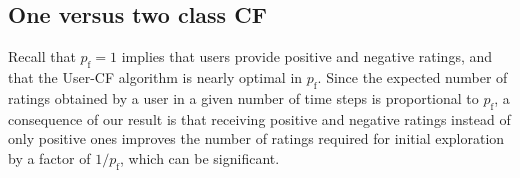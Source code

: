 \documentclass{article}
\newcommand\Comment[1]{\framebox[0.5\textwidth]{ \parbox{0.5\textwidth}{#1}  } \par}
\newcommand\pf{p_{\mathrm{f}}}
\newcommand{\setQ}{\mc Q}
\begin{document}



\vspace{-0.2cm}
\subsection{One versus two class CF}
\vspace{-0.2cm}

Recall that $\pf=1$ implies that users provide positive and negative ratings, and that the User-CF algorithm is nearly optimal in $\pf$. Since the expected number of ratings obtained by a user in a given number of time steps is proportional to $\pf$, 
 a consequence of our result is that receiving positive and negative ratings instead of only positive ones improves the number of ratings required for initial exploration by a factor of $1/\pf$, which can be significant. 
\end{document}
